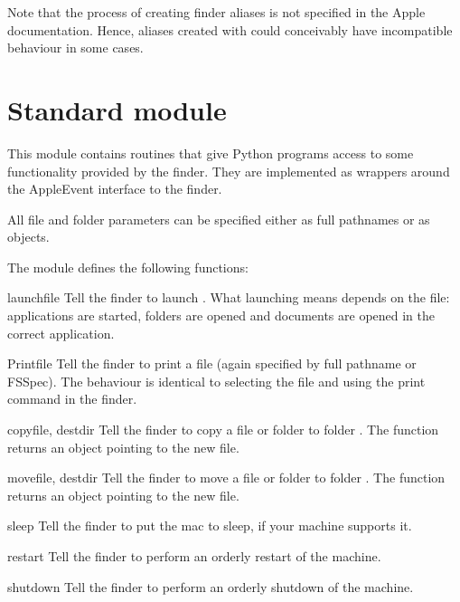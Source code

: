 Note that the process of creating finder aliases is not specified in
the Apple documentation. Hence, aliases created with 
could conceivably have incompatible behaviour in some cases.

\section{Standard module }

This module contains routines that give Python programs access to some
functionality provided by the finder. They are implemented as wrappers
around the AppleEvent interface to the finder.

All file and folder parameters can be specified either as full
pathnames or as  objects.

The  module defines the following functions:

\renewcommand{\indexsubitem}{(in module macostools)}

\begin{funcdesc}{launch}{file}
Tell the finder to launch . What launching means depends on the file:
applications are started, folders are opened and documents are opened
in the correct application.
\end{funcdesc}

\begin{funcdesc}{Print}{file}
Tell the finder to print a file (again specified by full pathname or
FSSpec). The behaviour is identical to selecting the file and using
the print command in the finder.
\end{funcdesc}

\begin{funcdesc}{copy}{file, destdir}
Tell the finder to copy a file or folder  to folder
. The function returns an  object pointing to
the new file.
\end{funcdesc}

\begin{funcdesc}{move}{file, destdir}
Tell the finder to move a file or folder  to folder
. The function returns an  object pointing to
the new file.
\end{funcdesc}

\begin{funcdesc}{sleep}{}
Tell the finder to put the mac to sleep, if your machine supports it.
\end{funcdesc}

\begin{funcdesc}{restart}{}
Tell the finder to perform an orderly restart of the machine.
\end{funcdesc}

\begin{funcdesc}{shutdown}{}
Tell the finder to perform an orderly shutdown of the machine.
\end{funcdesc}
